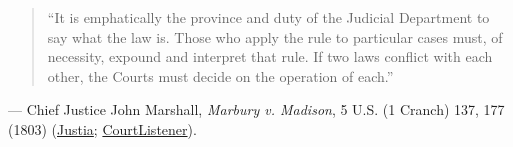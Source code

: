 \documentclass[12pt]{article}
\begin{document}
\begin{quote}
``It is emphatically the province and duty of the Judicial Department to say what the law is. Those who apply the rule to particular cases must, of necessity, expound and interpret that rule. If two laws conflict with each other, the Courts must decide on the operation of each.''
\end{quote}
\noindent --- Chief Justice John Marshall, \textit{Marbury v. Madison}, 5 U.S. (1 Cranch) 137, 177 (1803) (\href{https://supreme.justia.com/cases/federal/us/5/137/}{Justia}; \href{https://www.courtlistener.com/opinion/84759/marbury-v-madison/}{CourtListener}).
\end{document}

